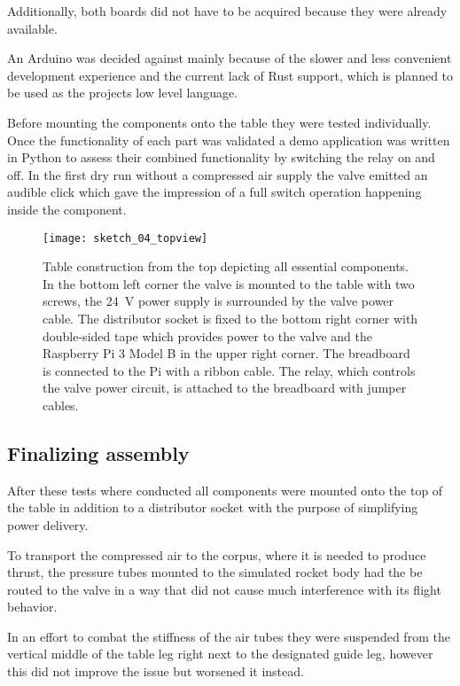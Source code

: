 Additionally, both boards did not have to be acquired because they were already available. 

An Arduino was decided against mainly because of the slower and less convenient development experience and the current lack of Rust \cite{rust} support, which is planned to be used as the projects low level language.

Before mounting the components onto the table they were tested individually. Once the functionality of each part was validated a demo application was written in Python to assess their combined functionality by switching the relay on and off. In the first dry run without a compressed air supply the valve emitted an audible click which gave the impression of a full switch operation happening inside the component.

\begin{figure}[h]
\centering

\texttt{[image: sketch\_04\_topview]}

\caption{Table construction from the top depicting all essential components. In the bottom left corner the valve is mounted to the table with two screws, the \SI{24}{\volt} power supply is surrounded by the valve power cable. The distributor socket is fixed to the bottom right corner with double-sided tape which provides power to the valve and the Raspberry Pi 3 Model B in the upper right corner. The breadboard is connected to the Pi with a ribbon cable. The relay, which controls the valve power circuit, is attached to the breadboard with jumper cables.}
\end{figure}

\subsection{Finalizing assembly}
After these tests where conducted all components were mounted onto the top of the table in addition to a distributor socket with the purpose of simplifying power delivery.

To transport the compressed air to the corpus, where it is needed to produce thrust, the pressure tubes mounted to the simulated rocket body had the be routed to the valve in a way that did not cause much interference with its flight behavior. 

In an effort to combat the stiffness of the air tubes they were suspended from the vertical middle of the table leg right next to the designated guide leg, however this did not improve the issue but worsened it instead. 

